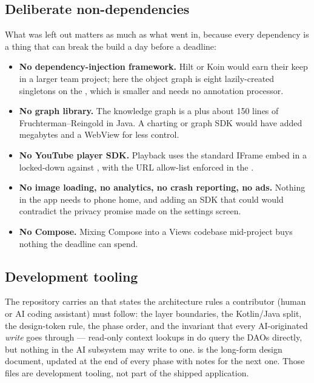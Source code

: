 \subsection{Deliberate non-dependencies}

What was left out matters as much as what went in, because every dependency is a thing that can break the
build a day before a deadline:

\begin{itemize}
  \item \textbf{No dependency-injection framework.} Hilt or Koin would earn their keep in a larger team
        project; here the object graph is eight lazily-created singletons on the , which
        is smaller and needs no annotation processor.
  \item \textbf{No graph library.} The knowledge graph is a  plus about 150 lines of
        Fruchterman--Reingold in Java. A charting or graph SDK would have added megabytes and a WebView
        for less control.
  \item \textbf{No YouTube player SDK.} Playback uses the standard IFrame embed in a locked-down
         against , with the URL allow-list enforced in the
        .
  \item \textbf{No image loading, no analytics, no crash reporting, no ads.} Nothing in the app needs to
        phone home, and adding an SDK that could would contradict the privacy promise made on the
        settings screen.
  \item \textbf{No Compose.} Mixing Compose into a Views codebase mid-project buys nothing the deadline
        can spend.
\end{itemize}

\subsection{Development tooling}

The repository carries an  that states the architecture rules a contributor (human or
AI coding assistant) must follow: the layer boundaries, the Kotlin/Java split, the design-token rule, the
phase order, and the invariant that every AI-originated \emph{write} goes through 
--- read-only context lookups in  do query the DAOs directly, but nothing in the AI
subsystem may write to one.  is the
long-form design document, updated at the end of every phase with notes for the next one. Those files are
development tooling, not part of the shipped application.

